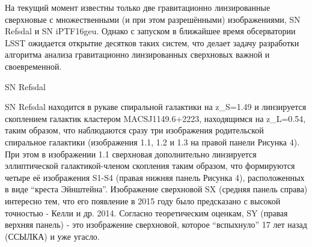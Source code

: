 На текущий момент известны только две гравитационно линзированные сверхновые с множественными (и при этом разрешёнными) изображениями, SN Refsdal и SN iPTF16geu. Однако с запуском в ближайшее время обсерватории LSST ожидается открытие десятков таких систем, что делает задачу разработки алгоритма анализа гравитационно линзированных сверхновых важной и своевременной.

SN Refsdal

SN Refsdal находится в рукаве спиральной галактики на z_S=1.49 и линзируется скоплением галактик кластером MACSJ1149.6+2223, находящимся на z_L=0.54, таким образом, что наблюдаются сразу три изображения родительской спиральное галактики (изображения 1.1, 1.2 и 1.3 на правой панели Рисунка 4). При этом в изображении 1.1 сверхновая дополнительно линзируется эллиптической галактикой-членом скопления таким образом, что формируются четыре её изображения S1-S4 (правая нижняя панель Рисунка 4), расположенных в виде “креста Эйнштейна”. Изображение сверхновой SX (средняя панель справа) интересно тем, что его появление в 2015 году было предсказано с высокой точностью - Келли и др. 2014. Согласно теоретическим оценкам, SY (правая верхняя панель) - это изображение сверхновой, которое “вспыхнуло” 17 лет назад (ССЫЛКА) и уже угасло.
